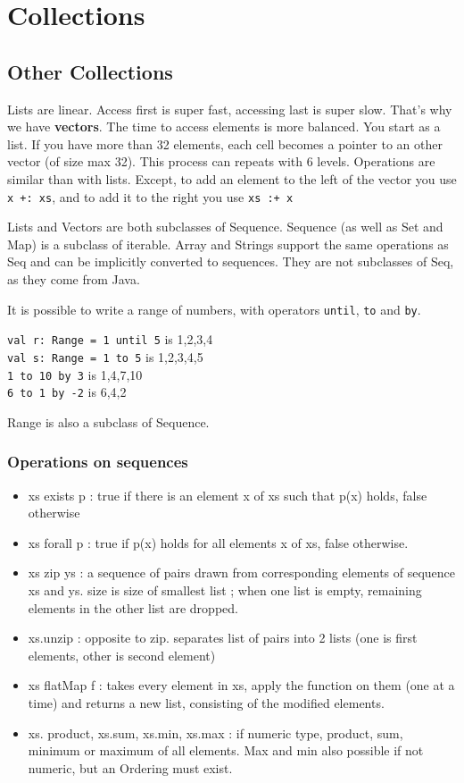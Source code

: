 \documentclass[12pt,a4paper]{article}
\begin{document}
\section{Collections}
\subsection{Other Collections}
Lists are linear. Access first is super fast, accessing last is super slow. That's why we have \textbf{vectors}. The time to access elements is more balanced. You start as a list. If you have more than 32 elements, each cell becomes a pointer to an other vector (of size max 32). This process can repeats with 6 levels. Operations are similar than with lists. Except, to add an element to the left of the vector you use \texttt{x +: xs}, and to add it to the right you use \texttt{xs :+ x}

 Lists and Vectors are both subclasses of Sequence. Sequence (as well as Set and Map) is a subclass of iterable. Array and Strings support the same operations as Seq and can be implicitly converted to sequences. They are not subclasses of Seq, as they come from Java.

 It is possible to write a range of numbers, with operators \texttt{until}, \texttt{to} and \texttt{by}. 
\begin{exemple}
	\texttt{val r: Range = 1 until 5} is 1,2,3,4\\
	\texttt{val s: Range = 1 to 5} is 1,2,3,4,5\\
	\texttt{1 to 10 by 3} is 1,4,7,10\\
	\texttt{6 to 1 by -2} is 6,4,2
\end{exemple}
Range is also a subclass of Sequence.
\subsubsection{Operations on sequences}
\begin{itemize}
	\item 	xs exists p : true if there is an element x of xs such that p(x) holds, false otherwise
	\item 	xs forall p : true if p(x) holds for all elements x of xs, false otherwise.
	\item 	xs zip ys : a sequence of pairs drawn from corresponding elements of sequence xs and ys. size is size of smallest list ; when one list is empty, remaining elements in the other list are dropped.
	\item 	xs.unzip  : opposite to zip. separates list of pairs into 2 lists (one is first elements, other is second element)
	\item  	xs flatMap f : takes every element in xs, apply the function on them (one at a time) and returns a new list, consisting of the modified elements.
	\item 	xs. product, xs.sum, xs.min, xs.max : if numeric type, product, sum, minimum or maximum of all elements. Max and min also possible if not numeric, but an Ordering must exist.
\end{itemize}
\end{document}

